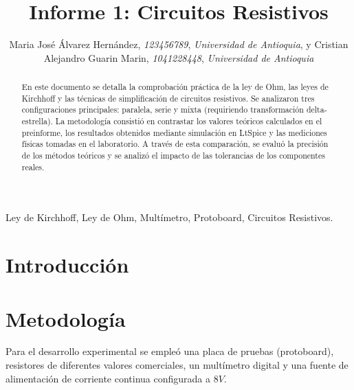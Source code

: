 \documentclass[journal]{IEEEtran}
\begin{document}
\title{Informe 1: Circuitos Resistivos}
\author{Maria José Álvarez Hernández, \textit{123456789}, \textit{Universidad de Antioquia}, 
        y Cristian Alejandro Guarin Marin, \textit{1041228448}, \textit{Universidad de Antioquia}}

\maketitle

\begin{abstract}
En este documento se detalla la comprobación práctica de la ley de Ohm, las leyes de Kirchhoff y las técnicas de simplificación de circuitos resistivos. 
Se analizaron tres configuraciones principales: paralela, serie y mixta (requiriendo transformación delta-estrella). La metodología consistió en contrastar 
los valores teóricos calculados en el preinforme, los resultados obtenidos mediante simulación en LtSpice y las mediciones físicas tomadas en el laboratorio. 
A través de esta comparación, se evaluó la precisión de los métodos teóricos y se analizó el impacto de las tolerancias de los componentes reales.
\end{abstract}

\begin{IEEEkeywords}
Ley de Kirchhoff, Ley de Ohm, Multímetro, Protoboard, Circuitos Resistivos.
\end{IEEEkeywords}

\section{Introducción}


\section{Metodología}
Para el desarrollo experimental se empleó una placa de pruebas (protoboard), resistores de diferentes valores comerciales, un multímetro digital y una 
fuente de alimentación de corriente continua configurada a $8V$. 
\end{document}
